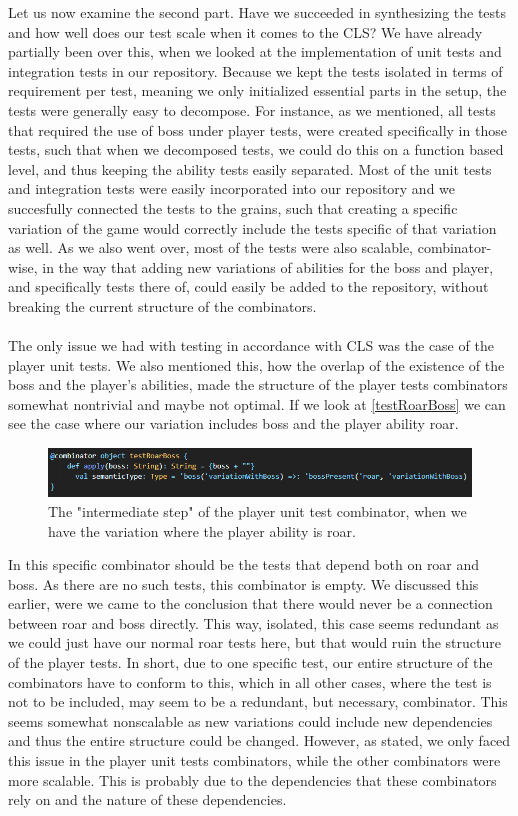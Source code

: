 Let us now examine the second part. Have we succeeded in synthesizing the tests and how well does our test scale when it comes to the CLS? We have already partially been over this, when we looked at the implementation of unit tests and integration tests in our repository. Because we kept the tests isolated in terms of requirement per test, meaning we only initialized essential parts in the setup, the tests were generally easy to decompose. For instance, as we mentioned, all tests that required the use of boss under player tests, were created specifically in those tests, such that when we decomposed tests, we could do this on a function based level, and thus keeping the ability tests easily separated. Most of the unit tests and integration tests were easily incorporated into our repository and we succesfully connected the tests to the grains, such that creating a specific variation of the game would correctly include the tests specific of that variation as well. As we also went over, most of the tests were also scalable, combinator-wise, in the way that adding new variations of abilities for the boss and player, and specifically tests there of, could easily be added to the repository, without breaking the current structure of the combinators. \\
\\
The only issue we had with testing in accordance with CLS was the case of the player unit tests. We also mentioned this, how the overlap of the existence of the boss and the player's abilities, made the structure of the player tests combinators somewhat nontrivial and maybe not optimal. If we look at \autoref{testRoarBoss} we can see the case where our variation includes boss and the player ability roar.
\begin{figure}[]
    \centering
    \includegraphics[width=\linewidth]{Materials/TestingDiscussion/testRoarBoss}
    \caption{The "intermediate step" of the player unit test combinator, when we have the variation where the player ability is roar.}
    \label{testRoarBoss}
\end{figure} 
In this specific combinator should be the tests that depend both on roar and boss. As there are no such tests, this combinator is empty. We discussed this earlier, were we came to the conclusion that there would never be a connection between roar and boss directly. This way, isolated, this case seems redundant as we could just have our normal roar tests here, but that would ruin the structure of the player tests. In short, due to one specific test, our entire structure of the combinators have to conform to this, which in all other cases, where the test is not to be included, may seem to be a redundant, but necessary, combinator. This seems somewhat nonscalable as new variations could include new dependencies and thus the entire structure could be changed. However, as stated, we only faced this issue in the player unit tests combinators, while the other combinators were more scalable. This is probably due to the dependencies that these combinators rely on and the nature of these dependencies.\\
